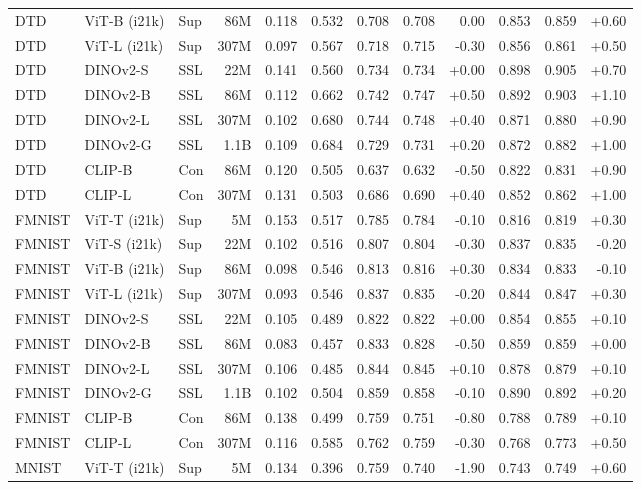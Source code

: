 \begin{table}[!htbp]
\begin{tabular}{lllrrr|rrr|rrr}
DTD & ViT-B (i21k) & Sup & 86M & 0.118 & 0.532 & 0.708 & 0.708 & 0.00 & 0.853 & 0.859 & +0.60 \\
DTD & ViT-L (i21k) & Sup & 307M & 0.097 & 0.567 & 0.718 & 0.715 & -0.30 & 0.856 & 0.861 & +0.50 \\
DTD & DINOv2-S & SSL & 22M & 0.141 & 0.560 & 0.734 & 0.734 & +0.00 & 0.898 & 0.905 & +0.70 \\
DTD & DINOv2-B & SSL & 86M & 0.112 & 0.662 & 0.742 & 0.747 & +0.50 & 0.892 & 0.903 & +1.10 \\
DTD & DINOv2-L & SSL & 307M & 0.102 & 0.680 & 0.744 & 0.748 & +0.40 & 0.871 & 0.880 & +0.90 \\
DTD & DINOv2-G & SSL & 1.1B & 0.109 & 0.684 & 0.729 & 0.731 & +0.20 & 0.872 & 0.882 & +1.00 \\
DTD & CLIP-B & Con & 86M & 0.120 & 0.505 & 0.637 & 0.632 & -0.50 & 0.822 & 0.831 & +0.90 \\
DTD & CLIP-L & Con & 307M & 0.131 & 0.503 & 0.686 & 0.690 & +0.40 & 0.852 & 0.862 & +1.00 \\
\midrule
FMNIST & ViT-T (i21k) & Sup & 5M & 0.153 & 0.517 & 0.785 & 0.784 & -0.10 & 0.816 & 0.819 & +0.30 \\
FMNIST & ViT-S (i21k) & Sup & 22M & 0.102 & 0.516 & 0.807 & 0.804 & -0.30 & 0.837 & 0.835 & -0.20 \\
FMNIST & ViT-B (i21k) & Sup & 86M & 0.098 & 0.546 & 0.813 & 0.816 & +0.30 & 0.834 & 0.833 & -0.10 \\
FMNIST & ViT-L (i21k) & Sup & 307M & 0.093 & 0.546 & 0.837 & 0.835 & -0.20 & 0.844 & 0.847 & +0.30 \\
FMNIST & DINOv2-S & SSL & 22M & 0.105 & 0.489 & 0.822 & 0.822 & +0.00 & 0.854 & 0.855 & +0.10 \\
FMNIST & DINOv2-B & SSL & 86M & 0.083 & 0.457 & 0.833 & 0.828 & -0.50 & 0.859 & 0.859 & +0.00 \\
FMNIST & DINOv2-L & SSL & 307M & 0.106 & 0.485 & 0.844 & 0.845 & +0.10 & 0.878 & 0.879 & +0.10 \\
FMNIST & DINOv2-G & SSL & 1.1B & 0.102 & 0.504 & 0.859 & 0.858 & -0.10 & 0.890 & 0.892 & +0.20 \\
FMNIST & CLIP-B & Con & 86M & 0.138 & 0.499 & 0.759 & 0.751 & -0.80 & 0.788 & 0.789 & +0.10 \\
FMNIST & CLIP-L & Con & 307M & 0.116 & 0.585 & 0.762 & 0.759 & -0.30 & 0.768 & 0.773 & +0.50 \\
\midrule
MNIST & ViT-T (i21k) & Sup & 5M & 0.134 & 0.396 & 0.759 & 0.740 & -1.90 & 0.743 & 0.749 & +0.60 \\

\end{tabular}
\end{table}
